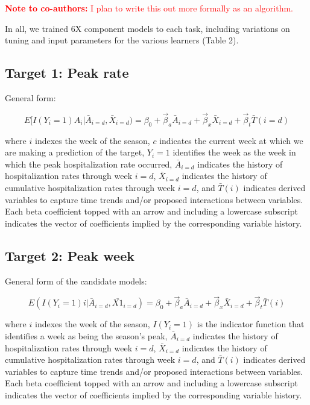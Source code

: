 \documentclass[10pt,letterpaper]{article}
\begin{document}
\textcolor{red}{\textbf{Note to co-authors:} I plan to write this out more formally as an algorithm.}

In all, we trained 6X component models to each task, including
variations on tuning and input parameters for the various learners
(Table 2).

\hypertarget{target-1-peak-rate}{%
\subsection{Target 1: Peak rate}\label{target-1-peak-rate}}

General form:

\[E[I(Y_i = 1)A_i | \bar{A}_{i=d}, \bar{X}_{i=d}) = \beta_0 + \vec{\beta}_a \bar{A}_{i=d} + \vec{\beta}_x \bar{X}_{i=d} + \vec{\beta}_t \bar{T}(i=d)\]

where \(i\) indexes the week of the season, \(c\) indicates the current
week at which we are making a prediction of the target, \(Y_i = 1\)
identifies the week as the week in which the peak hospitalization rate
occurred, \(\bar{A}_{i=d}\) indicates the history of hospitalization
rates through week \(i=d\), \(\bar{X}_{i=d}\) indicates the history of
cumulative hospitalization rates through week \(i=d\), and
\(\bar{T}(i)\) indicates derived variables to capture time trends and/or
proposed interactions between variables. Each beta coefficient topped
with an arrow and including a lowercase subscript indicates the vector
of coefficients implied by the corresponding variable history.

\hypertarget{target-2-peak-week}{%
\subsection{Target 2: Peak week}\label{target-2-peak-week}}

General form of the candidate models:

\[E(I(Y_i = 1)i | \bar{A}_{i=d}, \bar{X1}_{i=d}) = \beta_0 + \vec{\beta}_a \bar{A}_{i=d} + \vec{\beta}_x \bar{X}_{i=d} + \vec{\beta}_t  \bar{T}(i)\]

where \(i\) indexes the week of the season, \(I(Y_i = 1)\) is the
indicator function that identifies a week as being the season's peak,
\(\bar{A}_{i=d}\) indicates the history of hospitalization rates through
week \(i=d\), \(\bar{X}_{i=d}\) indicates the history of cumulative
hospitalization rates through week \(i=d\), and \(\bar{T}(i)\) indicates
derived variables to capture time trends and/or proposed interactions
between variables. Each beta coefficient topped with an arrow and
including a lowercase subscript indicates the vector of coefficients
implied by the corresponding variable history.
\end{document}
